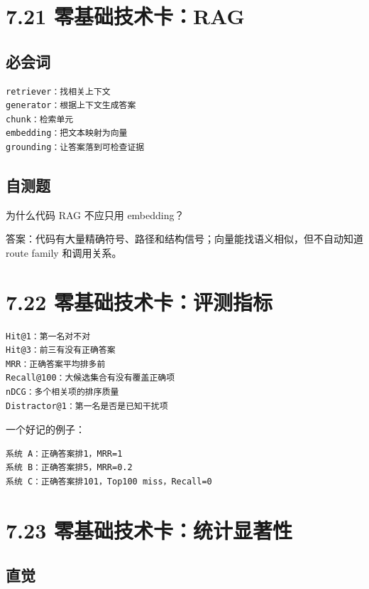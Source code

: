 \documentclass[UTF8,12pt,openany]{ctexbook}
\begin{document}
\section{7.21 零基础技术卡：RAG}

\subsection{必会词}

\begin{lstlisting}
retriever：找相关上下文
generator：根据上下文生成答案
chunk：检索单元
embedding：把文本映射为向量
grounding：让答案落到可检查证据
\end{lstlisting}

\subsection{自测题}

为什么代码 RAG 不应只用 embedding？\par

答案：代码有大量精确符号、路径和结构信号；向量能找语义相似，但不自动知道 route family 和调用关系。\par

\section{7.22 零基础技术卡：评测指标}

\begin{lstlisting}
Hit@1：第一名对不对
Hit@3：前三有没有正确答案
MRR：正确答案平均排多前
Recall@100：大候选集合有没有覆盖正确项
nDCG：多个相关项的排序质量
Distractor@1：第一名是否是已知干扰项
\end{lstlisting}

一个好记的例子：\par

\begin{lstlisting}
系统 A：正确答案排1，MRR=1
系统 B：正确答案排5，MRR=0.2
系统 C：正确答案排101，Top100 miss，Recall=0
\end{lstlisting}

\section{7.23 零基础技术卡：统计显著性}

\subsection{直觉}
\end{document}
